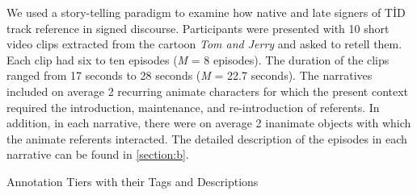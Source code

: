 \documentclass[]{elsarticle} %
\begin{document}
We used a story-telling paradigm to examine how native and late signers
of TİD track reference in signed discourse. Participants were presented
with 10 short video clips extracted from the cartoon \emph{Tom and
Jerry} and asked to retell them. Each clip had six to ten episodes
(\emph{M} = 8 episodes). The duration of the clips ranged from 17
seconds to 28 seconds (\emph{M} = 22.7 seconds). The narratives included
on average 2 recurring animate characters for which the present context
required the introduction, maintenance, and re-introduction of
referents. In addition, in each narrative, there were on average 2
inanimate objects with which the animate referents interacted. The
detailed description of the episodes in each narrative can be found in
\ref{section:b}.

\begin{table}[p]

\begin{center}
\begin{threeparttable}

\caption{\label{tab:tab-2}Annotation Tiers with their Tags and Descriptions}

\footnotesize{

}
\end{threeparttable}
\end{center}
\end{table}
\end{document}
